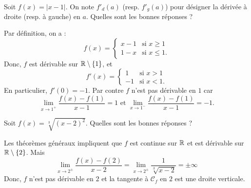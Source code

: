 \begin{question}
Soit $\displaystyle f(x)=|x-1|$. On note $f'_d(a)$ (resp. $f'_g(a)$) pour désigner la dérivée à droite (resp. à gauche) en $a$. Quelles sont les bonnes réponses ?
\begin{answers}  
\end{answers}
\begin{explanations}
Par définition, on a :
$$f(x)=\left\{ \begin{array}{ll}x-1&\mbox{si }x\geq 1\\ 1-x&\mbox{si }x\leq 1.
\end{array}\right.$$
Donc, $f$ est dérivable sur $\mathbb{R}\setminus\{1\}$, et
$$f'(x)=\left\{ \begin{array}{ll}1&\mbox{si }x> 1\\ -1&\mbox{si }x< 1.
\end{array}\right.$$
En particulier, $f'(0)=-1$. Par contre $f$ n'est pas dérivable en $1$ car
$$\lim _{x\to 1^+}\frac{f(x)-f(1)}{x-1}=1 \mbox{ et }\lim _{x\to 1^-}\frac{f(x)-f(1)}{x-1}=-1.$$
\end{explanations}
\end{question}




\begin{question}
Soit $\displaystyle f(x)=\sqrt[3]{(x-2)^2}$. Quelles sont les bonnes réponses ?
\begin{answers}  
\end{answers}
\begin{explanations}
Les théorèmes généraux impliquent que $f$ est continue sur $\mathbb{R}$ et est dérivable sur $\mathbb{R}\setminus\{2\}$. Mais
$$\lim_{x\to 2^{\pm}}\frac{f(x)-f(2)}{x-2}=\lim_{x\to 2^{\pm}}\frac{1}{\sqrt[3]{x-2}}={\pm}\infty $$
Donc, $f$ n'est pas dérivable en $2$ et la tangente à $\mathscr{C}_f$ en $2$ est une droite verticale.
\end{explanations}
\end{question}




